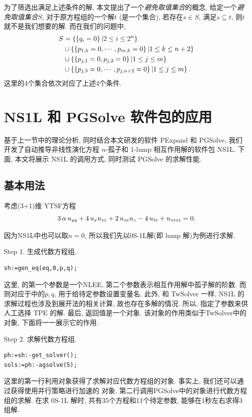 为了筛选出满足上述条件的解, 本文提出了一个\emph{避免取值集合}的概念. 给定一个\emph{避免取值集合}$S$, 对于原方程组的一个解$t$ (是一个集合), 若存在$s\in S$, 满足$s\subseteq t$, 则$t$就不是我们想要的解. 而在我们的问题中, 
\begin{equation}
\begin{aligned}
    S&=\left\{\left\{q_i=0\right\}|2\le i \le 2^n\right\} \\ 
     &\cup \left\{\left\{p_{1,k}=0,\cdots,p_{m,k}=0\right\}|1\le k \le n+2\right\}  \\
     &\cup \left\{\left\{p_{j,1}=0,p_{j,2}=0\right\}|1\le j \le m\right\} \\ 
     &\cup \left\{\left\{p_{j,3}=0,\cdots,p_{j,n+2}=0\right\}|1\le j \le m\right\} . 
\end{aligned}
\end{equation}
这里的4个集合依次对应了上述4个条件. 

\section{NS1L 和 PGSolve 软件包的应用}
基于上一节中的理论分析, 同时结合本文研发的软件 PExpand 和 PGSolve, 我们开发了自动推导非线性演化方程 $n$-孤子和 1-lump 相互作用解的软件包 NS1L. 下面, 本文将展示 NS1L 的调用方式, 同时测试 PGSolve 的求解性能.

\subsection{基本用法}
考虑(3+1)维 YTSF方程\CITEcaYTSF 
\begin{equation}
    3\,\alpha\,u_{{{\it yy}}}+4\,u_{{x}}u_{{{\it xz}}}+2\,u_{{{\it xx}}}u_{{z}}-4\,u_{{{\it tx}}}+u_{{{\it xxxz}}}=0. 
\end{equation}

因为NS1L中也可以取$n=0$, 所以我们先以0S-1L解(即 lump 解)为例进行求解. 

Step 1. 生成代数方程组.
\begin{verbatim}
sh:=gen_eq(eq,0,p,q);
\end{verbatim}
这里,  的第一个参数是一个NLEE, 第二个参数表示相互作用解中孤子解的阶数. 而则对应于中的$p,q$, 用于给待定参数设置变量名. 此外, 和 TwSolver 一样, NS1L 的求解过程也涉及到\Painleve{}展开法的相关计算, 故也存在多解的情况. 所以, 指定了参数来供人工选择 TPE 的解. 最后, 返回值是一个对象. 该对象的作用类似于TwSolver中的对象, 下面将一一展示它的作用. 

Step 2. 求解代数方程组.
\begin{verbatim}
ph:=sh:-get_solver();
sols:=ph:-agsolve(5);
\end{verbatim}
这里的第一行利用对象获得了求解对应代数方程组的对象. 事实上, 我们还可以通过获得使用并行策略进行加速的 对象. 第二行调用PGSolve中的对象进行代数方程组的求解. 在求 0S-1L 解时, 共有35个方程和11个待定参数, 能够在1秒左右求得3组解. 

